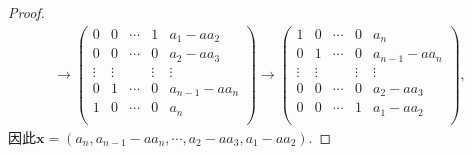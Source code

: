 \documentclass[../../main.tex]{subfiles}%
\begin{document}
\begin{proof}
\begin{gather*}
\rightarrow \left( \begin{matrix}
0&		0&		\cdots&		1&		a_1-aa_2\\
0&		0&		\cdots&		0&		a_2-aa_3\\
\vdots&		\vdots&		&		\vdots&		\vdots\\
0&		1&		\cdots&		0&		a_{n-1}-aa_n\\
1&		0&		\cdots&		0&		a_n\\
\end{matrix} \right) \rightarrow \left( \begin{matrix}
1&		0&		\cdots&		0&		a_n\\
0&		1&		\cdots&		0&		a_{n-1}-aa_n\\
\vdots&		\vdots&		&		\vdots&		\vdots\\
0&		0&		\cdots&		0&		a_2-aa_3\\
0&		0&		\cdots&		1&		a_1-aa_2\\
\end{matrix} \right),
\end{gather*}
因此\(\boldsymbol{x}=(a_n,a_{n - 1} - a a_n,\cdots,a_2 - a a_3,a_1 - a a_2)\).
\end{proof}
\end{document}
